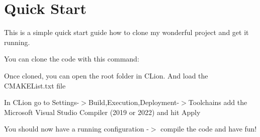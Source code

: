 \chapter{Quick Start}
\hypertarget{index}{}\label{index}
\label{index_md__c_1_2repositories_2uni_227-gl3-odonnell_2code_2docs_2_quick_start}%
%
 This is a simple quick start guide how to clone my wonderful project and get it running.


\begin{DoxyEnumerate}
\item You can clone the code with this command\+:
\end{DoxyEnumerate}


\begin{DoxyCode}{0}

\end{DoxyCode}



\begin{DoxyEnumerate}
\item Once cloned, you can open the root folder in CLion. And load the {\ttfamily CMAKEList.\+txt} file
\item In CLion go to Settings-\/\texorpdfstring{$>$}{>}Build,Execution,Deployment-\/\texorpdfstring{$>$}{>}Toolchains add the Microsoft Visual Studio Compiler (2019 or 2022) and hit Apply
\item You should now have a running configuration -\/\texorpdfstring{$>$}{>} compile the code and have fun! 
\end{DoxyEnumerate}